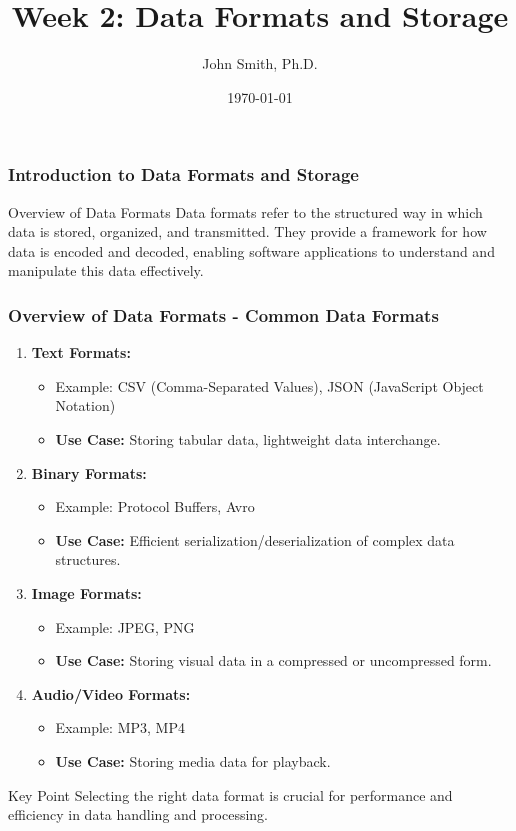 \documentclass[aspectratio=169]{beamer}
\title[Week 2: Data Formats and Storage]{Week 2: Data Formats and Storage}
\author{John Smith, Ph.D.} %
\date{\today}
\begin{document}
\frame{\titlepage}

\begin{frame}[fragile]
    \frametitle{Introduction to Data Formats and Storage}
    \begin{block}{Overview of Data Formats}
        Data formats refer to the structured way in which data is stored, organized, and transmitted. They provide a framework for how data is encoded and decoded, enabling software applications to understand and manipulate this data effectively.
    \end{block}
\end{frame}

\begin{frame}[fragile]
    \frametitle{Overview of Data Formats - Common Data Formats}
    \begin{enumerate}
        \item \textbf{Text Formats:}
        \begin{itemize}
            \item Example: CSV (Comma-Separated Values), JSON (JavaScript Object Notation)
            \item \textbf{Use Case:} Storing tabular data, lightweight data interchange.
        \end{itemize}
        
        \item \textbf{Binary Formats:}
        \begin{itemize}
            \item Example: Protocol Buffers, Avro
            \item \textbf{Use Case:} Efficient serialization/deserialization of complex data structures.
        \end{itemize}
        
        \item \textbf{Image Formats:}
        \begin{itemize}
            \item Example: JPEG, PNG
            \item \textbf{Use Case:} Storing visual data in a compressed or uncompressed form.
        \end{itemize}
        
        \item \textbf{Audio/Video Formats:}
        \begin{itemize}
            \item Example: MP3, MP4
            \item \textbf{Use Case:} Storing media data for playback.
        \end{itemize}
    \end{enumerate}
    \begin{block}{Key Point}
        Selecting the right data format is crucial for performance and efficiency in data handling and processing.
    \end{block}
\end{frame}
\end{document}
